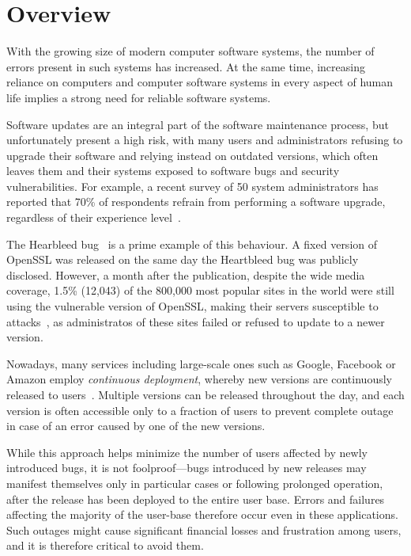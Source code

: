 \chapter{Overview}
\label{chap:overview}

With the growing size of modern computer software systems, the number of errors
present in such systems has increased. At the same time, increasing reliance on
computers and computer software systems in every aspect of human life implies a
strong need for reliable software systems.

Software updates are an integral part of the software maintenance process, but
unfortunately present a high risk, with many users and administrators refusing
to upgrade their software and relying instead on outdated versions, which often
leaves them and their systems exposed to software bugs and security
vulnerabilities. For example, a recent survey of 50 system administrators has
reported that 70\% of respondents refrain from performing a software upgrade,
regardless of their experience level~\cite{crameri:updates}.

The Hearbleed bug~\cite{heartbleed} is a prime example of this behaviour. A
fixed version of OpenSSL was released on the same day the Heartbleed bug was
publicly disclosed.  However, a month after the publication, despite the wide
media coverage, 1.5\% (12,043) of the 800,000 most popular sites in the world
were still using the vulnerable version of OpenSSL, making their servers
susceptible to attacks~\cite{heartbleed-prevalent}, as administratos of these
sites failed or refused to update to a newer version.

Nowadays, many services including large-scale ones such as Google, Facebook or
Amazon employ \emph{continuous deployment}, whereby new versions are
continuously released to users~\cite{johnson2009}. Multiple versions can be
released throughout the day, and each version is often accessible only to a
fraction of users to prevent complete outage in case of an error caused by one
of the new versions.

While this approach helps minimize the number of users affected by newly
introduced bugs, it is not foolproof---bugs introduced by new releases may
manifest themselves only in particular cases or following prolonged operation,
after the release has been deployed to the entire user base. Errors and
failures affecting the majority of the user-base therefore occur even in these
applications. Such outages might cause significant financial losses and
frustration among users, and it is therefore critical to avoid them.


